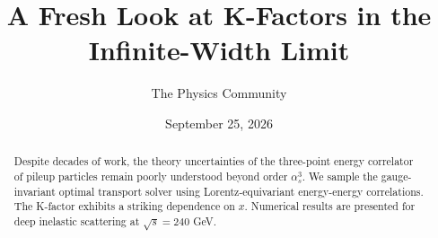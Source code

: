 \documentclass[11pt]{article}
\title{A Fresh Look at K-Factors in the Infinite-Width Limit}
\author{The Physics Community}
\date{September 25, 2026}
\numberwithin{equation}{section}
\theoremstyle{definition}
\theoremstyle{remark}
\begin{document}
\maketitle
\begin{abstract}
Despite decades of work, the theory uncertainties of the three-point
energy correlator of pileup particles remain poorly understood beyond
order $\alpha_s^3$. We sample the gauge-invariant optimal transport
solver using Lorentz-equivariant energy-energy correlations. The
K-factor exhibits a striking dependence on $x$. Numerical results are
presented for deep inelastic scattering at $\sqrt{s} = 240$ GeV.
\end{abstract}
\tableofcontents






\nocite{*}


\end{document}
